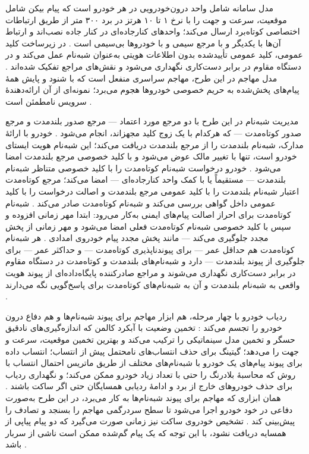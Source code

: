 مدل سامانه شامل واحد درون‌خودرویی در هر خودرو است که پیام بیکن شامل موقعیت، سرعت و جهت را با نرخ ۱ تا ۱۰ هرتز در برد ۳۰۰ متر از طریق ارتباطات اختصاصی کوتاه‌برد ارسال می‌کند؛ واحدهای کنارجاده‌ای در کنار جاده نصب‌اند و ارتباط آن‌ها با یکدیگر و با مرجع سیمی و با خودروها بی‌سیمی است \cite{al-aniPrivacySafetyImprovement2023}. در زیرساخت کلید عمومی، کلید عمومی تأییدشده بدون اطلاعات هویتی به‌عنوان شبه‌نام عمل می‌کند و در دستگاه مقاوم در برابر دست‌کاری نگهداری می‌شود و نقش‌های مراجع تفکیک شده‌اند \cite{al-aniPrivacySafetyImprovement2023}. مدل مهاجم در این طرح، مهاجم سراسری منفعل است که با شنود و پایش همهٔ پیام‌های پخش‌شده به حریم خصوصی خودروها هجوم می‌برد؛ نمونه‌ای از آن ارائه‌دهندهٔ سرویس نامطمئن است \cite{al-aniPrivacySafetyImprovement2023}.

مدیریت شبه‌نام در این طرح با دو مرجع مورد اعتماد — مرجع صدور بلندمدت و مرجع صدور کوتاه‌مدت — که هرکدام با یک زوج کلید مجهز‌اند، انجام می‌شود \cite{al-aniPrivacySafetyImprovement2023}. خودرو با ارائهٔ مدارک، شبه‌نام بلندمدت را از مرجع بلندمدت دریافت می‌کند؛ این شبه‌نام هویت ایستای خودرو است، تنها با تغییر مالک عوض می‌شود و با کلید خصوصی مرجع بلندمدت امضا می‌شود \cite{al-aniPrivacySafetyImprovement2023}. خودرو درخواست شبه‌نام کوتاه‌مدت را با کلید خصوصی متناظر شبه‌نام بلندمدت — مستقیماً یا با کمک واحد کنارجاده‌ای — امضا می‌کند؛ مرجع کوتاه‌مدت اعتبار شبه‌نام بلندمدت را با کلید عمومی مرجع بلندمدت و اصالت درخواست را با کلید عمومی داخل گواهی بررسی می‌کند و شبه‌نام کوتاه‌مدت صادر می‌کند \cite{al-aniPrivacySafetyImprovement2023}. شبه‌نام کوتاه‌مدت برای احراز اصالت پیام‌های ایمنی به‌کار می‌رود: ابتدا مهر زمانی افزوده و سپس با کلید خصوصی شبه‌نام کوتاه‌مدت فعلی امضا می‌شود و مهر زمانی از پخش مجدد جلوگیری می‌کند — مانند پخش مجدد پیام خودروی امدادی \cite{al-aniPrivacySafetyImprovement2023}. هر شبه‌نام کوتاه‌مدت هم حداقل عمر — برای پیوندناپذیری کوتاه‌مدت — و حداکثر عمر — برای جلوگیری از پیوند بلندمدت — دارد و شبه‌نام‌های بلندمدت و کوتاه‌مدت در دستگاه مقاوم در برابر دست‌کاری نگهداری می‌شوند و مراجع صادرکننده پایگاه‌داده‌ای از پیوند هویت واقعی به شبه‌نام بلندمدت و آن به شبه‌نام‌های کوتاه‌مدت برای پاسخ‌گویی نگه می‌دارند \cite{al-aniPrivacySafetyImprovement2023}.

ردیاب خودرو با چهار مرحله، هم ابزار مهاجم برای پیوند شبه‌نام‌ها و هم دفاع درون خودرو را تجسم می‌کند \cite{al-aniPrivacySafetyImprovement2023}: تخمین وضعیت با آبکرد کالمن که اندازه‌گیری‌های نادقیق حسگر و تخمین مدل سینماتیکی را ترکیب می‌کند و بهترین تخمین موقعیت، سرعت و جهت را می‌دهد؛ گیتینگ برای حذف انتساب‌های نامحتمل پیش از انتساب؛ انتساب داده برای پیوند پیام‌های یک خودرو با شبه‌نام‌های مختلف از طریق ماتریس احتمال انتساب با روش  که محاسبهٔ بلادرنگ را حتی با تعداد زیاد خودرو ممکن می‌کند؛ و نگهداری ردیاب برای حذف خودروهای خارج از برد و ادامهٔ ردیابی همسایگان حتی اگر ساکت باشند \cite{al-aniPrivacySafetyImprovement2023}. همان ابزاری که مهاجم برای پیوند شبه‌نام‌ها به کار می‌برد، در این طرح به‌صورت دفاعی در خود خودرو اجرا می‌شود تا سطح سردرگمی مهاجم را بسنجد و تصادف را پیش‌بینی کند \cite{al-aniPrivacySafetyImprovement2023}. تشخیص خودروی ساکت نیز زمانی صورت می‌گیرد که دو پیام پیاپی از همسایه دریافت نشود، با این توجه که یک پیام گم‌شده ممکن است ناشی از سربار باشد \cite{al-aniPrivacySafetyImprovement2023}.

